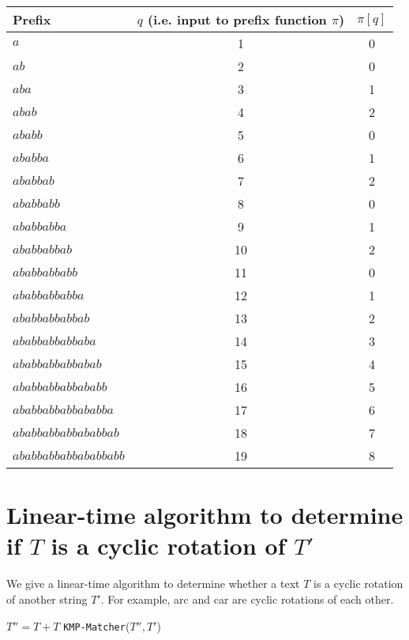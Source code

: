 \documentclass[paper=a4, fontsize=11pt]{scrartcl} %
\numberwithin{equation}{section} %
\numberwithin{figure}{section} %
\numberwithin{table}{section} %
\begin{document}
\begin{center}
\begin{tabular}{| l | c | c |}
\hline
\textbf{Prefix} &\textbf{$q$ (i.e. input to prefix function $\pi$)} & $\pi[q]$ \\
\hline
$a$ & 1 & 0 \\
\hline
$ab$ & 2 & 0 \\
\hline
$aba$ & 3 & 1 \\
\hline
$abab$ & 4 & 2 \\
\hline
$ababb$ & 5 & 0 \\
\hline
$ababba$ & 6 & 1 \\
\hline
$ababbab$ & 7 & 2 \\
\hline
$ababbabb$ & 8 & 0 \\
\hline
$ababbabba$ & 9 & 1 \\
\hline
$ababbabbab$ & 10 & 2 \\
\hline
$ababbabbabb$ & 11 & 0 \\
\hline
$ababbabbabba$ & 12 & 1 \\
\hline
$ababbabbabbab$ & 13 & 2 \\
\hline
$ababbabbabbaba$ & 14 & 3 \\
\hline
$ababbabbabbabab$ & 15 & 4 \\
\hline
$ababbabbabbababb$ & 16 & 5 \\
\hline
$ababbabbabbababba$ & 17 & 6 \\
\hline
$ababbabbabbababbab$ & 18 & 7 \\
\hline
$ababbabbabbababbabb$ & 19 & 8 \\
\hline
\end{tabular}
\end{center}


\section{Linear-time algorithm to determine if $T$ is a cyclic rotation of $T'$}

We give a linear-time algorithm to determine whether a text $T$ is a cyclic rotation of another string $T'$. For example, arc and car are cyclic rotations of each other.

\begin{algorithmic}
	\State $T'' = T + T$ 
	\State \texttt{KMP-Matcher}($T'', T'$)
\EndFunction
\end{algorithmic}
\end{document}
